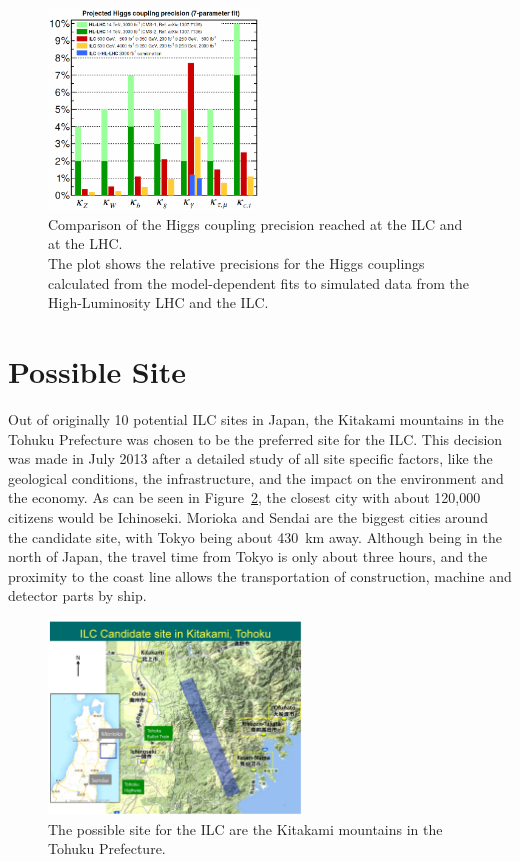 \begin{figure}
\centering
\includegraphics[width=0.5\textwidth]{Figures/Higgs_couplings.png}
\caption[Higgs coupling precisions]{Comparison of the Higgs coupling precision reached at the ILC and at the LHC.\cite[p. 9]{ILCPhysics}\\
The plot shows the relative precisions for the Higgs couplings calculated from the model-dependent fits to simulated data from the High-Luminosity LHC and the ILC.}
\label{fig:Higgs_couplings}
\end{figure}

\section{Possible Site}
\label{ILC:site}
Out of originally 10 potential ILC sites in Japan, the Kitakami mountains in the Tohuku Prefecture was chosen to be the preferred site for the ILC.
This decision was made in July 2013 after a detailed study of all site specific factors, like the geological conditions, the infrastructure, and the impact on the environment and the economy.
As can be seen in Figure~\ref{fig:ILC_Site}, the closest city with about 120,000 citizens would be Ichinoseki.
Morioka and Sendai are the biggest cities around the candidate site, with Tokyo being about \SI{430}{\kilo\meter} away.
Although being in the north of Japan, the travel time from Tokyo is only about three hours, and the proximity to the coast line allows the transportation of construction, machine and detector parts by ship.

\begin{figure}
\centering
\includegraphics[width=0.6\textwidth]{Figures/ILC-site.jpg}
\caption[Possible site for the ILC]{The possible site for the ILC are the Kitakami mountains in the Tohuku Prefecture.\cite{Site}}
\label{fig:ILC_Site}
\end{figure}

